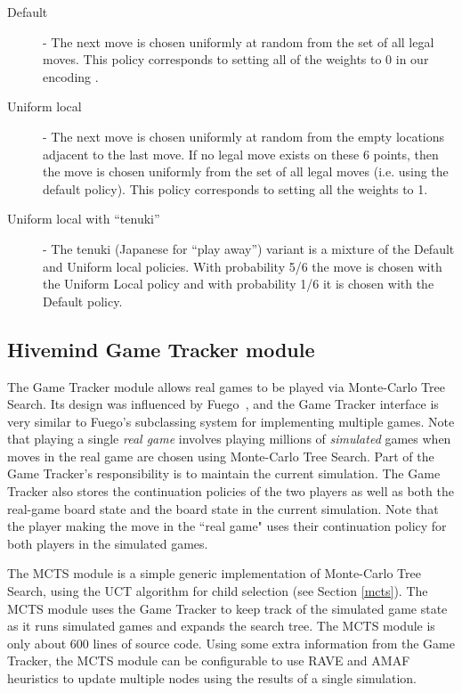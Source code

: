 \documentclass{acm_proc_article-sp}
\begin{document}
\begin{description}
	\item[Default] - The next move is chosen uniformly at random from the set of all legal moves.
	This policy corresponds to setting all of the weights to 0 in our encoding .
	\item[Uniform local] - The next move is chosen uniformly at random from the empty locations adjacent to the last move.
	If no legal move exists on these 6 points, then the move is chosen uniformly from the set of all legal moves 
	(i.e. using the default policy).  This policy corresponds to setting all the weights to 1.
	\item[Uniform local with ``tenuki''] - The tenuki (Japanese for  ``play away'') variant is a mixture of the Default and Uniform local policies.  
	With probability 5/6 the move is chosen with the Uniform Local policy and with probability 1/6 it is chosen with the Default policy. 
\end{description}


\subsection{Hivemind Game Tracker module}
\label{s:tracker}

The Game Tracker module allows real games to be played via Monte-Carlo Tree Search.
Its design was influenced by Fuego~\cite{Fuego},  and the Game Tracker interface is very similar to Fuego's subclassing system for implementing multiple games.
Note that playing a single \emph{real game} involves playing millions of  \emph{simulated} games when
moves in the real game are chosen using Monte-Carlo Tree Search.
Part of the Game Tracker's responsibility is to maintain the 
current simulation.
The Game Tracker also stores the continuation policies of the two players as well as both
the real-game board state and the board state in the current simulation.
Note that the player making the move in the ``real game" uses their continuation policy for both players in the simulated games.

The MCTS  module is a simple 
generic implementation of Monte-Carlo Tree Search, using the UCT algorithm for child selection
(see Section \ref{mcts}).
The MCTS module uses the Game Tracker to keep track of the simulated game state 
as it runs simulated games and expands the search tree.
The MCTS module is only about 600 lines of source code. 
Using some extra information from the Game Tracker,  
the MCTS module can be configurable to use RAVE and AMAF heuristics to 
update multiple nodes using the results of a single simulation.  
\end{document}
